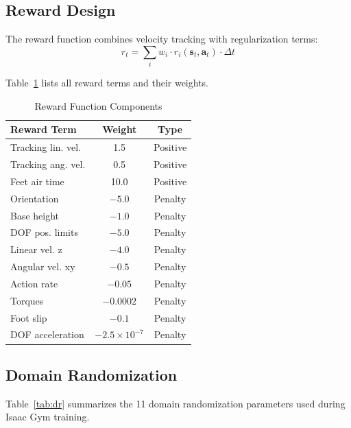 \documentclass[conference]{IEEEtran}
\begin{document}
\subsection{Reward Design}

The reward function combines velocity tracking with regularization terms:
\begin{equation}
r_t = \sum_{i} w_i \cdot r_i(\mathbf{s}_t, \mathbf{a}_t) \cdot \Delta t
\end{equation}

Table~\ref{tab:rewards} lists all reward terms and their weights.

\begin{table}[t]
\caption{Reward Function Components}
\label{tab:rewards}
\centering
\begin{tabular}{lcc}
\toprule
\textbf{Reward Term} & \textbf{Weight} & \textbf{Type} \\
\midrule
Tracking lin. vel. & 1.5 & Positive \\
Tracking ang. vel. & 0.5 & Positive \\
Feet air time & 10.0 & Positive \\
Orientation & $-5.0$ & Penalty \\
Base height & $-1.0$ & Penalty \\
DOF pos. limits & $-5.0$ & Penalty \\
Linear vel. z & $-4.0$ & Penalty \\
Angular vel. xy & $-0.5$ & Penalty \\
Action rate & $-0.05$ & Penalty \\
Torques & $-0.0002$ & Penalty \\
Foot slip & $-0.1$ & Penalty \\
DOF acceleration & $-2.5 \times 10^{-7}$ & Penalty \\
\bottomrule
\end{tabular}
\end{table}

\subsection{Domain Randomization}

Table~\ref{tab:dr} summarizes the 11 domain randomization parameters used during Isaac Gym training.
\end{document}
